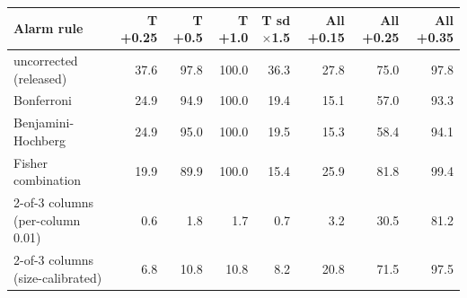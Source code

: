 \begin{tabular}{lrrrrrrr}
\toprule
\textbf{Alarm rule} & \textbf{T +0.25} & \textbf{T +0.5} & \textbf{T +1.0} & \textbf{T sd$\times$1.5} & \textbf{All +0.15} & \textbf{All +0.25} & \textbf{All +0.35} \\
\midrule
uncorrected (released) & 37.6 & 97.8 & 100.0 & 36.3 & 27.8 & 75.0 & 97.8 \\
Bonferroni & 24.9 & 94.9 & 100.0 & 19.4 & 15.1 & 57.0 & 93.3 \\
Benjamini-Hochberg & 24.9 & 95.0 & 100.0 & 19.5 & 15.3 & 58.4 & 94.1 \\
Fisher combination & 19.9 & 89.9 & 100.0 & 15.4 & 25.9 & 81.8 & 99.4 \\
2-of-3 columns (per-column 0.01) & 0.6 & 1.8 & 1.7 & 0.7 & 3.2 & 30.5 & 81.2 \\
2-of-3 columns (size-calibrated) & 6.8 & 10.8 & 10.8 & 8.2 & 20.8 & 71.5 & 97.5 \\
\bottomrule
\end{tabular}
